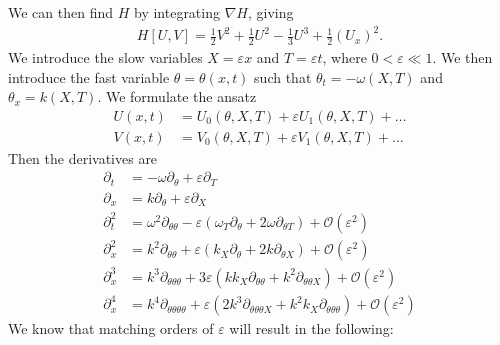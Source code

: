 \documentclass[12pt]{article}
\newcommand{\pd}[0]{\partial}
\newcommand{\mc}[1]{\mathcal{#1}}
\numberwithin{equation}{section}
\begin{document}
We can then find $H$ by integrating $\nabla H$, giving
\begin{align}
    H[U,V] = \frac{1}{2}V^2 + \frac{1}{2}U^2 - \frac{1}{3}U^3 + \frac{1}{2}\left(U_x\right)^2.
\end{align}
We introduce the slow variables $X = \varepsilon x$ and $T = \varepsilon t$, where $0 < \varepsilon \ll 1$. We then introduce the fast variable $\theta = \theta(x,t)$ such that $\theta_t = -\omega(X,T)$ and $\theta_x = k(X,T)$. We formulate the ansatz 
\begin{subequations}
\begin{align}
    U(x,t) &= U_0(\theta,X,T) + \varepsilon U_1(\theta,X,T) + \ldots \\
    V(x,t) &= V_0(\theta,X,T) + \varepsilon V_1(\theta,X,T) + \ldots
\end{align} \label{U,V ansatz}
\end{subequations}
Then the derivatives are 
\begin{align*}
    \pd_t &= -\omega\pd_{\theta} + \varepsilon \pd_T \\
    \pd_x &= k\pd_{\theta} + \varepsilon \pd_X \\
    \pd_t^2 &= \omega^2\pd_{\theta\theta} -\varepsilon(\omega_T\pd_{\theta} + 2\omega \pd_{\theta T}) + \mathcal{O}(\varepsilon^2) \\
    \pd_x^2 &= k^2\pd_{\theta\theta} +\varepsilon(k_X\pd_{\theta} + 2k \pd_{\theta X}) + \mathcal{O}(\varepsilon^2) \\
    \pd_x^3 &= k^3 \pd_{\theta \theta\theta} + 3\varepsilon(kk_X \pd_{\theta\theta} + k^2 \pd_{\theta\theta X})  + \mc O(\varepsilon^2)\\
    \pd_x^4 &= k^4\pd_{\theta\theta\theta\theta} + \varepsilon\left(2k^3\pd_{\theta\theta\theta X} + k^2k_X\pd_{\theta\theta\theta}\right) + \mathcal{O}(\varepsilon^2)
\end{align*}
We know that matching orders of $\varepsilon$ will result in the following:
\end{document}
